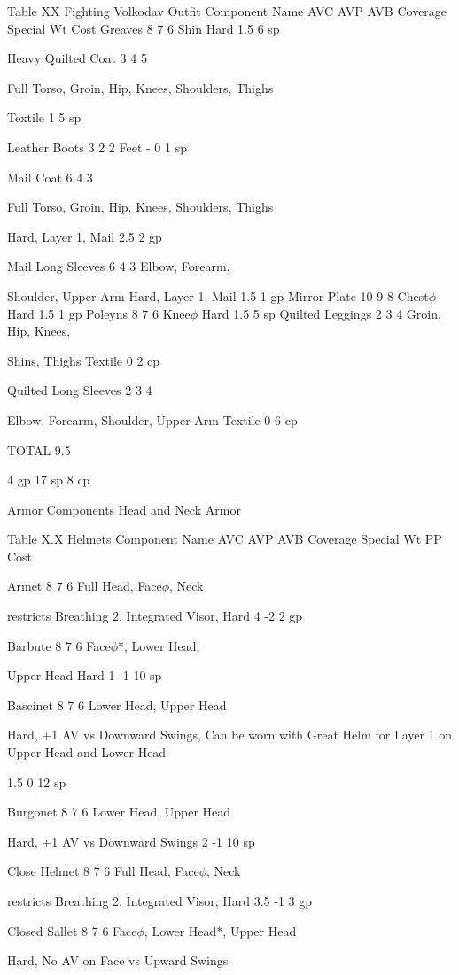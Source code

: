 \documentclass[oneside,11pt,english]{book}
\begin{document}
Table XX Fighting Volkodav Outfit
Component Name AVC AVP AVB Coverage Special Wt Cost
Greaves 8 7 6 Shin Hard 1.5 6 sp

Heavy Quilted Coat 3 4 5

Full Torso, Groin, Hip, 
Knees, Shoulders, 
Thighs

Textile 1 5 sp

Leather Boots 3 2 2 Feet - 0 1 sp

Mail Coat 6 4 3

Full Torso, Groin, Hip, 
Knees, Shoulders, 
Thighs

Hard, Layer 1, Mail 2.5 2 gp

Mail Long Sleeves 6 4 3 Elbow, Forearm, 

Shoulder, Upper Arm Hard, Layer 1, Mail 1.5 1 gp
Mirror Plate 10 9 8 Chest$\phi$ Hard 1.5 1 gp
Poleyns 8 7 6 Knee$\phi$ Hard 1.5 5 sp
Quilted Leggings 2 3 4 Groin, Hip, Knees, 

Shins, Thighs Textile 0 2 cp

Quilted Long 
Sleeves 2 3 4

Elbow, Forearm, 
Shoulder, Upper Arm Textile 0 6 cp

TOTAL 9.5

4 gp
17 sp
8 cp

Armor Components
Head and Neck Armor

Table X.X Helmets
Component Name AVC AVP AVB Coverage Special Wt PP Cost


Armet 8 7 6 Full Head, Face$\phi$,
Neck

restricts Breathing 2,
Integrated Visor, Hard 4 -2 2 gp

Barbute 8 7 6 Face$\phi$*, Lower Head, 

Upper Head Hard 1 -1 10 sp

Bascinet 8 7 6 Lower Head, Upper 
Head

Hard, +1 AV vs 
Downward Swings, Can 
be worn with Great Helm
for Layer 1 on Upper 
Head and Lower Head

1.5 0 12 sp

Burgonet 8 7 6 Lower Head, Upper 
Head

Hard, +1 AV vs 
Downward Swings 2 -1 10 sp

Close Helmet 8 7 6 Full Head, Face$\phi$,
Neck

restricts Breathing 2,
Integrated Visor, Hard 3.5 -1 3 gp

Closed Sallet 8 7 6 Face$\phi$, Lower Head*, 
Upper Head

Hard, No AV on Face vs 
Upward Swings
\end{document}
